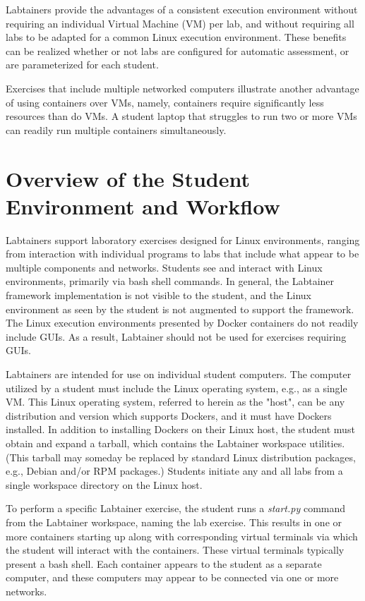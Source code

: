 \documentclass[12pt]{article}
\begin{document}
Labtainers provide the advantages of a consistent
execution environment without requiring
an individual Virtual Machine (VM) per lab, and without requiring all labs to be adapted for
a common Linux execution environment.   These benefits can be realized 
whether or not labs are configured for automatic assessment, 
or are parameterized for each student.

Exercises that include multiple networked computers illustrate another advantage 
of using containers over VMs, namely, containers require significantly less resources
than do VMs.  A student laptop that struggles to run two or more VMs can readily 
run multiple containers simultaneously. 

\section {Overview of the Student Environment and Workflow}
Labtainers support laboratory exercises designed for Linux environments,
ranging from interaction with individual programs to labs that include
what appear to be multiple components and networks.  Students see and interact with Linux
environments, primarily via bash shell commands. In general, the Labtainer
framework implementation is not visible to the student, and the Linux
environment as seen by the student is not augmented to support the framework.
The Linux execution environments presented by Docker containers do not readily
include GUIs.  As a result, Labtainer should not be used for exercises requiring
GUIs.

Labtainers are intended for use on individual student computers.
The computer utilized by a student must include the Linux operating system, e.g.,
as a single VM.  This Linux operating system, referred to herein
as the "host", can be any distribution and version
which supports Dockers, and it must have Dockers installed.  
In addition to installing Dockers on their Linux host, the student must
obtain and expand a tarball, which contains the Labtainer workspace utilities.
(This tarball may someday be replaced by standard Linux distribution packages,
e.g., Debian and/or RPM packages.)  Students initiate any and all labs from a
single workspace directory on the Linux host.

To perform a specific Labtainer exercise, the student runs a \textit{start.py} command from
the Labtainer workspace, naming the lab exercise.  This results in one or more
containers starting up along with corresponding virtual terminals via which the 
student will interact with the containers.  These virtual terminals typically
present a bash shell.  Each container appears to the student as a separate
computer, and these computers may appear to be connected via one or more networks.  
\end{document}
